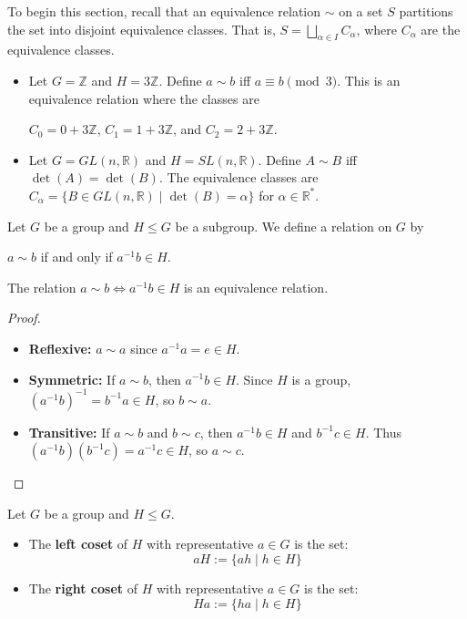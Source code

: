 To begin this section, recall that an equivalence relation $\sim$ on a set $S$ partitions the set into disjoint equivalence classes. That is, $S = \bigsqcup_{\alpha \in I} C_{\alpha}$, where $C_\alpha$ are the equivalence classes.
\begin{example}
\begin{itemize}
    \item Let $G = \mathbb{Z}$ and $H = 3\mathbb{Z}$. Define $a \sim b$ iff $a \equiv b \pmod 3$. This is an equivalence relation where the classes are 
    \begin{center}
    $C_0 = 0+3\mathbb{Z}$, $C_1 = 1+3\mathbb{Z}$, and $C_2 = 2+3\mathbb{Z}$.
    \end{center}
    \item Let $G = GL(n, \mathbb{R})$ and $H = SL(n, \mathbb{R})$. Define $A \sim B$ iff $\det(A) = \det(B)$. The equivalence classes are $C_{\alpha} = \{ B \in GL(n, \mathbb{R}) \mid \det(B) = \alpha \}$ for $\alpha \in \mathbb{R}^*$.
\end{itemize}
\end{example}

\begin{definition}
Let $G$ be a group and $H \le G$ be a subgroup. We define a relation on $G$ by 
\begin{center}
$a \sim b$ if and only if $a^{-1}b \in H$. 
\end{center}
\end{definition}

\begin{proposition}
The relation $a \sim b \iff a^{-1}b \in H$ is an equivalence relation.
\end{proposition}
\begin{proof}
\begin{itemize}
    \item[(i)] \textbf{Reflexive:} $a \sim a$ since $a^{-1}a = e \in H$.
    \item[(ii)] \textbf{Symmetric:} If $a \sim b$, then $a^{-1}b \in H$. Since $H$ is a group, $(a^{-1}b)^{-1} = b^{-1}a \in H$, so $b \sim a$.
    \item[(iii)] \textbf{Transitive:} If $a \sim b$ and $b \sim c$, then $a^{-1}b \in H$ and $b^{-1}c \in H$. Thus $(a^{-1}b)(b^{-1}c) = a^{-1}c \in H$, so $a \sim c$.
\end{itemize}
\end{proof}

\begin{definition}[Cosets]
Let $G$ be a group and $H \le G$. 
\begin{itemize}
    \item The \textbf{left coset} of $H$ with representative $a \in G$ is the set:
    $$aH := \{ ah \mid h \in H \}$$
    \item The \textbf{right coset} of $H$ with representative $a \in G$ is the set:
    $$Ha := \{ ha \mid h \in H \}$$
\end{itemize}
\end{definition}

